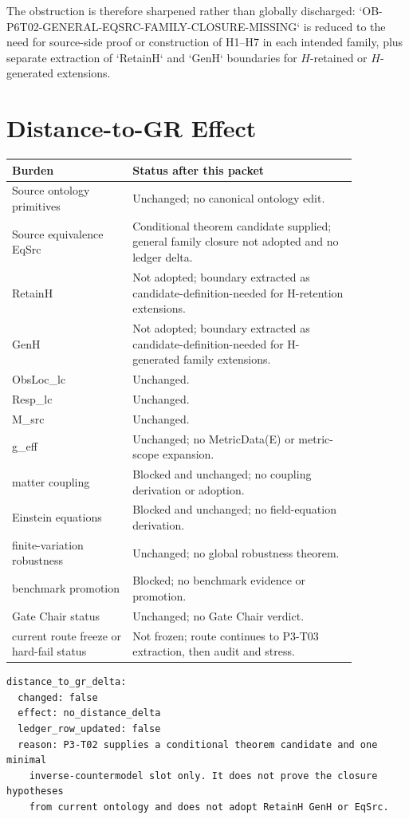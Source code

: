 \documentclass[11pt]{article}
\begin{document}
The obstruction is therefore sharpened rather than globally discharged:
`OB-P6T02-GENERAL-EQSRC-FAMILY-CLOSURE-MISSING` is reduced to the need for
source-side proof or construction of H1--H7 in each intended family, plus
separate extraction of `RetainH` and `GenH` boundaries for \(H\)-retained or
\(H\)-generated extensions.

\section{Distance-to-GR Effect}

\begin{longtable}{p{0.30\linewidth}p{0.56\linewidth}}
\toprule
Burden & Status after this packet \\
\midrule
Source ontology primitives & Unchanged; no canonical ontology edit. \\
Source equivalence EqSrc & Conditional theorem candidate supplied; general family closure not adopted and no ledger delta. \\
RetainH & Not adopted; boundary extracted as candidate-definition-needed for H-retention extensions. \\
GenH & Not adopted; boundary extracted as candidate-definition-needed for H-generated family extensions. \\
ObsLoc\_lc & Unchanged. \\
Resp\_lc & Unchanged. \\
M\_src & Unchanged. \\
g\_eff & Unchanged; no MetricData(E) or metric-scope expansion. \\
matter coupling & Blocked and unchanged; no coupling derivation or adoption. \\
Einstein equations & Blocked and unchanged; no field-equation derivation. \\
finite-variation robustness & Unchanged; no global robustness theorem. \\
benchmark promotion & Blocked; no benchmark evidence or promotion. \\
Gate Chair status & Unchanged; no Gate Chair verdict. \\
current route freeze or hard-fail status & Not frozen; route continues to P3-T03 extraction, then audit and stress. \\
\bottomrule
\end{longtable}

\begin{verbatim}
distance_to_gr_delta:
  changed: false
  effect: no_distance_delta
  ledger_row_updated: false
  reason: P3-T02 supplies a conditional theorem candidate and one minimal
    inverse-countermodel slot only. It does not prove the closure hypotheses
    from current ontology and does not adopt RetainH GenH or EqSrc.
\end{verbatim}
\end{document}
